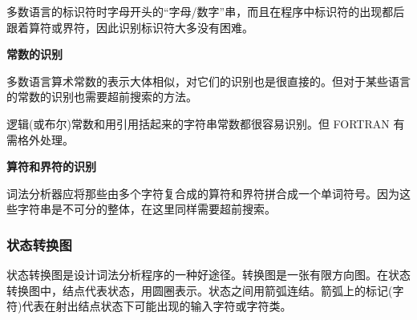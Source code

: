 多数语言的标识符时字母开头的``字母/数字''串，而且在程序中标识符的出现都后跟着算符或界符，因此识别标识符大多没有困难。

\textbf{常数的识别}

多数语言算术常数的表示大体相似，对它们的识别也是很直接的。但对于某些语言的常数的识别也需要超前搜索的方法。

逻辑(或布尔)常数和用引用括起来的字符串常数都很容易识别。但 FORTRAN 有需格外处理。

\textbf{算符和界符的识别}

词法分析器应将那些由多个字符复合成的算符和界符拼合成一个单词符号。因为这些字符串是不可分的整体，在这里同样需要超前搜索。

\subsubsection{状态转换图}

状态转换图是设计词法分析程序的一种好途径。转换图是一张有限方向图。在状态转换图中，结点代表状态，用圆圈表示。状态之间用箭弧连结。箭弧上的标记(字符)代表在射出结点状态下可能出现的输入字符或字符类。

